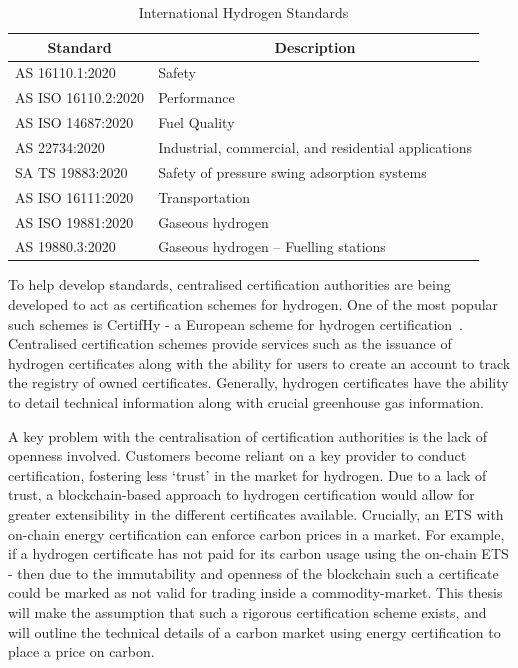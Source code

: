 \begin{table}[ht]
    \centering
    \begin{tabular}{|l|l|}
        \hline
        \multicolumn{1}{|c|}{\textbf{Standard}} & \multicolumn{1}{c|}{\textbf{Description}}            \\ \hline
        AS 16110.1:2020                         & Safety                                               \\ \hline
        AS ISO 16110.2:2020                     & Performance                                          \\ \hline
        AS ISO 14687:2020                       & Fuel Quality                                         \\ \hline
        AS 22734:2020                           & Industrial, commercial, and residential applications \\ \hline
        SA TS 19883:2020                        & Safety of pressure swing adsorption systems          \\ \hline
        AS ISO 16111:2020                       & Transportation                                       \\ \hline
        AS ISO 19881:2020                       & Gaseous hydrogen                                     \\ \hline
        AS 19880.3:2020                         & Gaseous hydrogen – Fuelling stations                 \\ \hline
    \end{tabular}
    \caption{International Hydrogen Standards}
    \label{tab:standards}
\end{table}

To help develop standards, centralised certification authorities
are being developed to act as certification schemes for hydrogen.
One of the most popular such schemes is CertifHy - a European
scheme for hydrogen certification~\cite{certifhy}. Centralised
certification schemes provide services such as the issuance of
hydrogen certificates along with the ability for users to create
an account to track the registry of owned certificates. Generally,
hydrogen certificates have the ability to detail technical information
along with crucial greenhouse gas information.

A key problem with the centralisation of certification authorities is the
lack of openness involved. Customers become reliant on a key provider to
conduct certification, fostering less `trust' in the market for hydrogen.
Due to a lack of trust, a blockchain-based approach to hydrogen
certification would allow for greater extensibility in the different
certificates available. Crucially, an ETS with on-chain energy
certification can enforce carbon prices in a market. For example,
if a hydrogen certificate has not paid for its carbon usage using
the on-chain ETS - then due to the immutability and openness of the
blockchain such a certificate could be marked as not valid for
trading inside a commodity-market. This thesis will make the
assumption that such a rigorous certification scheme exists, and will
outline the technical details of a carbon market using energy certification
to place a price on carbon.

